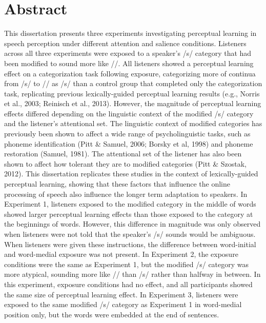
\chapter{Abstract}

This dissertation presents three experiments investigating perceptual learning in speech perception under different attention and salience conditions.
Listeners across all three experiments were exposed to a speaker's /s/ category that had been modified to sound more like /\textesh/.
All listeners showed a perceptual learning effect on a categorization task following exposure, categorizing more of continua from /s/ to /\textesh/ as /s/ than a control group that completed only the categorization task, replicating previous lexically-guided perceptual learning results (e.g., Norris et al., 2003; Reinisch et al., 2013).
However, the magnitude of perceptual learning effects differed depending on the linguistic context of the modified /s/ category and the listener's attentional set.
The linguistic context of modified categories has previously been shown to affect a wide range of psycholinguistic tasks, such as phoneme identification (Pitt \& Samuel, 2006; Borsky et al, 1998) and phoneme restoration (Samuel, 1981).
The attentional set of the listener has also been shown to affect how tolerant they are to modified categories (Pitt \& Szostak, 2012).
This dissertation replicates these studies in the context of lexically-guided perceptual learning, showing that these factors that influence the online processing of speech also influence the longer term adaptation to speakers.
In Experiment 1, listeners exposed to the modified category in the middle of words showed larger perceptual learning effects than those exposed to the category at the beginnings of words.
However, this difference in magnitude was only observed when listeners were not told that the speaker's /s/ sounds would be ambiguous.  
When listeners were given these instructions, the difference between word-initial and word-medial exposure was not present.
In Experiment 2, the exposure conditions were the same as Experiment 1, but the modified /s/ category was more atypical, sounding more like /\textesh/ than /s/ rather than halfway in between.
In this experiment, exposure conditions had no effect, and all participants showed the same size of perceptual learning effect.
In Experiment 3, listeners were exposed to the same modified /s/ category as Experiment 1 in word-medial position only, but the words were embedded at the end of sentences.
